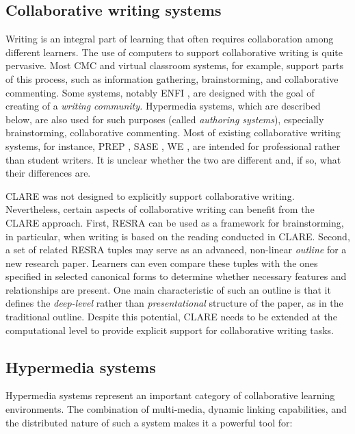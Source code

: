 \subsection{Collaborative writing systems}

Writing is an integral part of learning that often requires collaboration
among different learners. The use of computers to support collaborative
writing is quite pervasive. Most CMC and virtual classroom systems, for
example, support parts of this process, such as information gathering,
brainstorming, and collaborative commenting. Some systems, notably ENFI
\cite{Bruce93}, are designed with the goal of creating of a {\it writing
community.\/} Hypermedia systems, which are described below, are also used
for such purposes (called {\it authoring systems\/}), especially
brainstorming, collaborative commenting. Most of existing collaborative
writing systems, for instance, PREP
\cite{Neuwirth90issues,Neuwirth92Flexible}, SASE \cite{Baecker93User}, WE
\cite{Smith87Hypertext}, are intended for professional rather than student
writers. It is unclear whether the two are different and, if so, what their
differences are.

CLARE was not designed to explicitly support collaborative writing.
Nevertheless, certain aspects of collaborative writing can benefit from the
CLARE approach. First, RESRA can be used as a framework for brainstorming,
in particular, when writing is based on the reading conducted in
CLARE. Second, a set of related RESRA tuples may serve as an advanced,
non-linear {\it outline\/} for a new research paper. Learners can even
compare these tuples with the ones specified in selected canonical forms to
determine whether necessary features and relationships are present. One
main characteristic of such an outline is that it defines the {\it
deep-level\/} rather than {\it presentational\/} structure of the paper, as
in the traditional outline. Despite this potential, CLARE needs to be
extended at the computational level to provide explicit support for
collaborative writing tasks.


\subsection{Hypermedia systems}

Hypermedia systems represent an important category of collaborative
learning environments. The combination of multi-media, dynamic linking
capabilities, and the distributed nature of such a system makes it a
powerful tool for:

